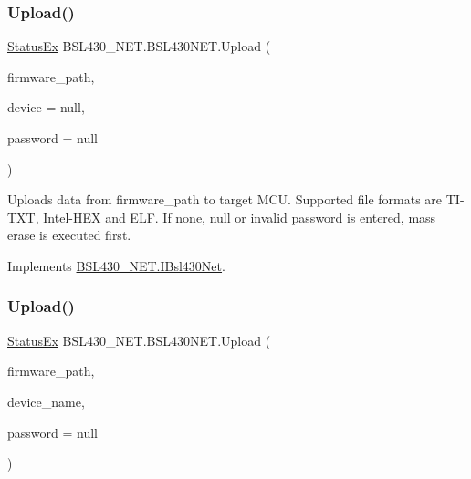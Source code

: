 \subsubsection{\texorpdfstring{Upload()}{Upload()}\hspace{0.1cm}{\footnotesize\ttfamily [1/2]}}
{\footnotesize\ttfamily \mbox{\hyperlink{class_b_s_l430___n_e_t_1_1_status_ex}{Status\+Ex}} B\+S\+L430\+\_\+\+N\+E\+T.\+B\+S\+L430\+N\+E\+T.\+Upload (\begin{DoxyParamCaption}\item[{string}]{firmware\+\_\+path,  }\item[{\mbox{\hyperlink{class_b_s_l430___n_e_t_1_1_bsl430_net_device}{Bsl430\+Net\+Device}}}]{device = {\ttfamily null},  }\item[{byte \mbox{[}$\,$\mbox{]}}]{password = {\ttfamily null} }\end{DoxyParamCaption})}



Uploads data from firmware\+\_\+path to target M\+CU. Supported file formats are T\+I-\/\+T\+XT, Intel-\/\+H\+EX and E\+LF. If none, null or invalid password is entered, mass erase is executed first. 



Implements \mbox{\hyperlink{interface_b_s_l430___n_e_t_1_1_i_bsl430_net_a598587fc08c2f9082b08abb65c058eaa}{B\+S\+L430\+\_\+\+N\+E\+T.\+I\+Bsl430\+Net}}.

\mbox{\label{class_b_s_l430___n_e_t_1_1_b_s_l430_n_e_t_a34ea55282fe44a886e4382caf4e391fc}} 
\subsubsection{\texorpdfstring{Upload()}{Upload()}\hspace{0.1cm}{\footnotesize\ttfamily [2/2]}}
{\footnotesize\ttfamily \mbox{\hyperlink{class_b_s_l430___n_e_t_1_1_status_ex}{Status\+Ex}} B\+S\+L430\+\_\+\+N\+E\+T.\+B\+S\+L430\+N\+E\+T.\+Upload (\begin{DoxyParamCaption}\item[{string}]{firmware\+\_\+path,  }\item[{string}]{device\+\_\+name,  }\item[{byte \mbox{[}$\,$\mbox{]}}]{password = {\ttfamily null} }\end{DoxyParamCaption})}



